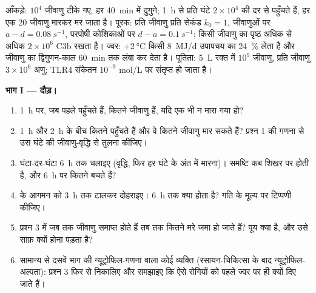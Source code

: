 \begin{problem}
\label{pb:b3:innate-immunity:1}
आँकड़े: $10^{4}$ जीवाणु टीके गए, हर \qty{40}{min} में दुगुने;
 \qty{1}{h} से प्रति घंटे $2\times 10^{4}$ की दर से
पहुँचते हैं, हर एक $20$ जीवाणु मारकर मर जाता है। पूरक: प्रति जीवाणु
प्रति सेकंड $k_{0} = 1$, जीवाणुओं पर $a - d = \qty{0.08}{s^{-1}}$,
परपोषी कोशिकाओं पर $d - a =
\qty{0.1}{s^{-1}}$; किसी जीवाणु का पृष्ठ अधिक से अधिक
$2\times 10^{6}$ C3b रखता है। ज्वर: $+\qty{2}{\celsius}$ किसी
\qty{8}{MJ/d} उपापचय का \qty{24}{\%} लेता है और जीवाणु का द्विगुणन-काल
\qty{60}{min} तक लंबा कर देता है। पूतिता: \qty{5}{L} रक्त में
$10^{9}$ जीवाणु, प्रति जीवाणु $3\times 10^{6}$  अणु;
TLR4 संकेतन $10^{-9}$ mol/L  पर संतृप्त हो जाता है।

\medskip
\noindent\textbf{भाग I --- दौड़।}
\begin{enumerate}
  \item \qty{1}{h} पर, जब पहले  पहुँचते हैं, कितने जीवाणु
        हैं, यदि एक भी न मारा गया हो?
  \item \qty{1}{h} और \qty{2}{h} के बीच कितने  पहुँचते हैं
        और वे कितने जीवाणु मार सकते हैं? प्रश्न 1 की गणना से उस घंटे
        की जीवाणु-वृद्धि से तुलना कीजिए।
  \item घंटा-दर-घंटा \qty{6}{h} तक चलाइए (वृद्धि, फिर हर घंटे के अंत
        में मारना)। समष्टि कब शिखर पर होती है, और \qty{6}{h} पर कितने
        बचते हैं?
  \item {} के आगमन को \qty{3}{h} तक टालकर दोहराइए।
        \qty{6}{h} तक क्या होता है? गति के मूल्य पर टिप्पणी कीजिए।
  \item प्रश्न 3 में जब तक जीवाणु समाप्त होते हैं तब तक कितने मरे
         जमा हो जाते हैं? पूय क्या है, और उसे साफ़ क्यों
        होना पड़ता है?
  \item सामान्य से दसवें भाग की न्यूट्रोफिल-गणना वाला कोई व्यक्ति
        (रसायन-चिकित्सा के बाद न्यूट्रोफिल-अल्पता): प्रश्न 3 फिर से
        निकालिए और समझाइए कि ऐसे रोगियों को पहले ज्वर पर ही 
        क्यों दिए जाते हैं।
\end{enumerate}


\end{problem}
